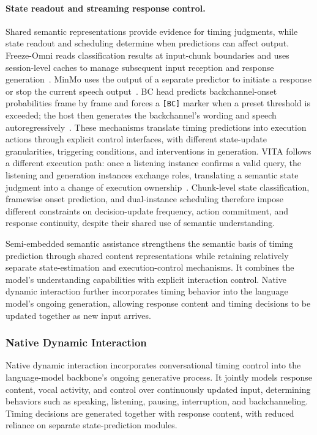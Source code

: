 \paragraph{State readout and streaming response control.}
Shared semantic representations provide evidence for timing judgments, while state readout and scheduling determine when predictions can affect output. Freeze-Omni reads classification results at input-chunk boundaries and uses session-level caches to manage subsequent input reception and response generation~\citep{DBLP:journals/corr/abs-2411-00774}. MinMo uses the output of a separate predictor to initiate a response or stop the current speech output~\citep{DBLP:journals/corr/abs-2501-06282}. BC head predicts backchannel-onset probabilities frame by frame and forces a \texttt{[BC]} marker when a preset threshold is exceeded; the host then generates the backchannel's wording and speech autoregressively~\citep{DBLP:journals/corr/abs-2609-29418}. These mechanisms translate timing predictions into execution actions through explicit control interfaces, with different state-update granularities, triggering conditions, and interventions in generation. VITA follows a different execution path: once a listening instance confirms a valid query, the listening and generation instances exchange roles, translating a semantic state judgment into a change of execution ownership~\citep{DBLP:journals/corr/abs-2408-05211}. Chunk-level state classification, framewise onset prediction, and dual-instance scheduling therefore impose different constraints on decision-update frequency, action commitment, and response continuity, despite their shared use of semantic understanding.

Semi-embedded semantic assistance strengthens the semantic basis of timing prediction through shared content representations while retaining relatively separate state-estimation and execution-control mechanisms. It combines the model's understanding capabilities with explicit interaction control. Native dynamic interaction further incorporates timing behavior into the language model's ongoing generation, allowing response content and timing decisions to be updated together as new input arrives.

\subsubsection{Native Dynamic Interaction}\label{sec:fd-native}

Native dynamic interaction incorporates conversational timing control into the language-model backbone's ongoing generative process. It jointly models response content, vocal activity, and control over continuously updated input, determining behaviors such as speaking, listening, pausing, interruption, and backchanneling. Timing decisions are generated together with response content, with reduced reliance on separate state-prediction modules.

